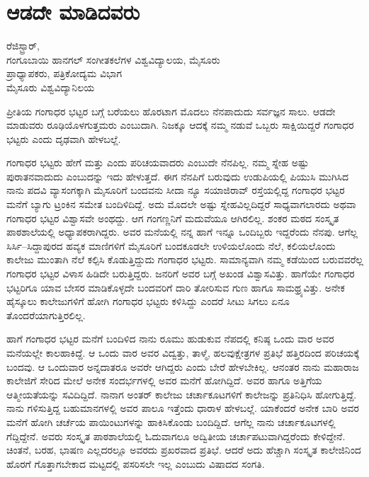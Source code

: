{\fontsize{14}{16}\selectfont
\chapter{ಆಡದೇ ಮಾಡಿದವರು}

\begin{center}
\smallskip

ರೆಜಿಸ್ಟ್ರಾರ್, \\ಗಂಗೂಬಾಯಿ ಹಾನಗಲ್ ಸಂಗೀತಕಲೆಗಳ ವಿಶ್ವವಿದ್ಯಾಲಯ, ಮೈಸೂರು\\
ಪ್ರಾಧ್ಯಾಪಕರು, ಪತ್ರಿಕೋದ್ಯಮ ವಿಭಾಗ\\
ಮೈಸೂರು ವಿಶ್ವವಿದ್ಯಾನಿಲಯ
\addrule
\end{center}

ಪ್ರೀತಿಯ ಗಂಗಾಧರ ಭಟ್ಟರ ಬಗ್ಗೆ ಬರೆಯಲು ಹೊರಟಾಗ ಮೊದಲು ನೆನಪಾದುದು ಸರ್ವಜ್ಞನ ಸಾಲು. ಆಡದೇ ಮಾಡುವರು ರೂಢಿಯೊಳಗುತ್ತಮರು ಎಂಬುದಾಗಿ. ನಿಜಕ್ಕೂ ಆದಕ್ಕೆ ನಮ್ಮ ನಡುವೆ ಒಬ್ಬರು ಸಾಕ್ಷಿಯಿದ್ದರೆ ಗಂಗಾಧರ ಭಟ್ಟರು ಎಂದು ದೃಢವಾಗಿ ಹೇಳಬಲ್ಲೆ.

ಗಂಗಾಧರ ಭಟ್ಟರು ಹೇಗೆ ಮತ್ತು ಎಂದು ಪರಿಚಯವಾದರು ಎಂಬುದೇ ನೆನಪಿಲ್ಲ. ನಮ್ಮ ಸ್ನೇಹ ಅಷ್ಟು ಪುರಾತನವಾದುದು ಎಂಬುದನ್ನು ಇದು ಹೇಳುತ್ತದೆ. ಈಗ ನೆನಪಿಗೆ ಬರುವುದು ಉಡುಪಿಯಲ್ಲಿ ಪಿಯುಸಿ ಮುಗಿಸಿದ ನಾನು ಪದವಿ ವ್ಯಾಸಂಗಕ್ಕಾಗಿ ಮೈಸೂರಿಗೆ ಬಂದವನು ಸೀದಾ ನ್ಯೂ ಸಯಾಜಿರಾವ್ ರಸ್ತೆಯಲ್ಲಿದ್ದ ಗಂಗಾಧರ ಭಟ್ಟರ ಮನೆಗೆ ಬ್ಯಾಗು ಟ್ರಂಕಿನ ಸಮೇತ ಬಂದಿಳಿದಿದ್ದೆ. ಅದು ಮೊದಲೇ ಅಷ್ಟು ಸ್ನೇಹವಿಲ್ಲದಿದ್ದರೆ ಸಾಧ್ಯವಾಗಲಾರದು ಅಥವಾ ಗಂಗಾಧರ ಭಟ್ಟರ ವಿಶ್ವಾಸವೇ ಅಂಥದ್ದು. ಆಗ ಗಂಗಣ್ಣನಿಗೆ ಮದುವೆಯೂ ಆಗಿರಲಿಲ್ಲ. ಶಂಕರ ಮಠದ ಸಂಸ್ಕೃತ ಪಾಠಶಾಲೆಯಲ್ಲಿ ಅಧ್ಯಾಪಕರಾಗಿದ್ದರು. ಅವರ ಮನೆಯಲ್ಲಿ ನನ್ನ ಹಾಗೆ ಇನ್ನೂ ಒಂದಿಬ್ಬರು ಇದ್ದರೆಂದು ನೆನಪು. ಆಗೆಲ್ಲ ಸಿರ್ಸಿ–ಸಿದ್ದಾಪುರದ ಹವ್ಯಕ ಮಾಣಿಗಳಿಗೆ ಮೈಸೂರಿಗೆ ಬಂದಕೂಡಲೇ ಉಳಿಯಲೊಂದು ನೆಲೆ, ಕಲಿಯಲೊಂದು ಕಾಲೇಜು ಮುಂತಾಗಿ ನೆಲೆ ಕಲ್ಪಿಸಿ ಕೊಡುತ್ತಿದ್ದುದು ಗಂಗಾಧರ ಭಟ್ಟರು. ಸಾಮಾನ್ಯವಾಗಿ ನಮ್ಮ ಕಡೆಯಿಂದ ಬರುವವರೆಲ್ಲ ಗಂಗಾಧರ ಭಟ್ಟರ ವಿಳಾಸ ಹಿಡಿದೇ ಬರುತ್ತಿದ್ದರು. ಜನರಿಗೆ ಅವರ ಬಗ್ಗೆ ಅಖಂಡ ವಿಶ್ವಾಸವಿತ್ತು. ಹಾಗೆಯೇ ಗಂಗಾಧರ ಭಟ್ಟರಿಗೂ ಯಾವ ಬೇಸರ ಮಾಡಿಕೊಳ್ಳದೇ ಬಂದವರಿಗೆ ದಾರಿ ತೋರಿಸುವ ಗುಣ ಹಾಗೂ ಸಾಮಥ್ರ್ಯವಿತ್ತು. ಅನೇಕ ಹೈಸ್ಕೂಲು ಕಾಲೇಜುಗಳಿಗೆ ಹೋಗಿ ಗಂಗಾಧರ ಭಟ್ಟರು ಕಳಿಸಿದ್ದು ಎಂದರೆ ಸೀಟು ಸಿಗಲು ಏನೂ ತೊಂದರೆಯಾಗುತ್ತಿರಲಿಲ್ಲ.

ಹಾಗೆ ಗಂಗಾಧರ ಭಟ್ಟರ ಮನೆಗೆ ಬಂದಿಳಿದ ನಾನು ರೂಮು ಹುಡುಕುವ ನೆಪದಲ್ಲಿ ಕನಿಷ್ಠ ಒಂದು ವಾರ ಅವರ ಮನೆಯಲ್ಲೇ ಕಾಲಹಾಕಿದ್ದೆ. ಆ ಒಂದು ವಾರ ಅವರ ವಿದ್ವತ್ತು, ತಾಳ್ಮೆ, ಹಲವುಕ್ಷೇತ್ರಗಳ ಪ್ರತಿಭೆ ಹತ್ತಿರದಿಂದ ಪರಿಚಯಕ್ಕೆ ಬಂದವು. ಆ ಒಂದುವಾರ ಅನ್ನದಾತರೂ ಅವರೇ ಆಗಿದ್ದರು ಎಂದು ಬೇರೆ ಹೇಳಬೇಕಿಲ್ಲ. ಆನಂತರ ನಾನು ಮಹಾರಾಜ ಕಾಲೇಜಿಗೆ ಸೇರಿದ ಮೇಲೆ ಅನೇಕ ಸಂದರ್ಭಗಳಲ್ಲಿ ಅವರ ಮನೆಗೆ ಹೋಗಿದ್ದಿದೆ. ಅವರ ಹಾಗೂ ಅತ್ತಿಗೆಯ ಆತ್ಮೀಯತೆಯನ್ನು ಸವಿದಿದ್ದಿದೆ. ನಾನಾಗ ಅಂತರ್ ಕಾಲೇಜು ಚರ್ಚಾಕೂಟಗಳಿಗೆ ಕಾಲೇಜನ್ನು ಪ್ರತಿನಿಧಿಸಿ ಹೋಗುತ್ತಿದ್ದೆ. ನಾನು ಗಳಿಸುತ್ತಿದ್ದ ಬಹುಮಾನಗಳಲ್ಲಿ ಅವರ ಪಾಲೂ ಇತ್ತೆಂದು ಧಾರಾಳ ಹೇಳಬಲ್ಲೆ. ಯಾಕೆಂದರೆ ಅನೇಕ ಬಾರಿ ಅವರ ಮನೆಗೆ ಹೋಗಿ ಚರ್ಚೆಯ ಪಾಯಿಂಟುಗಳನ್ನು ಹಾಕಿಸಿಕೊಂಡು ಬಂದಿದ್ದಿದೆ. ಆಗೆಲ್ಲ ನಾನು ಚರ್ಚಾಕೂಟಗಳಲ್ಲಿ ಗೆದ್ದಿದ್ದೇನೆ. ಅವರು ಸಂಸ್ಕೃತ ಪಾಠಶಾಲೆಯಲ್ಲಿ ಓದುವಾಗಲೂ ಅದ್ವಿತೀಯ ಚರ್ಚಾಪಟುವಾಗಿದ್ದರೆಂದು ಕೇಳಿದ್ದೇನೆ. ಚಿಂತನೆ, ಬರಹ, ಭಾಷಣ ಎಲ್ಲದರಲ್ಲೂ ಅವರದು ಪ್ರಖರವಾದ ಪ್ರತಿಭೆ. ಆದರೆ ಅದು ಹೆಚ್ಚಾಗಿ ಸಂಸ್ಕೃತ ಕಾಲೇಜಿನಿಂದ ಹೊರಗೆ ಗೊತ್ತಾಗಬೇಕಾದ ಮಟ್ಟದಲ್ಲಿ ಪಸರಿಸಲೇ ಇಲ್ಲ ಎಂಬುದು ವಿಷಾದದ ಸಂಗತಿ.

}
